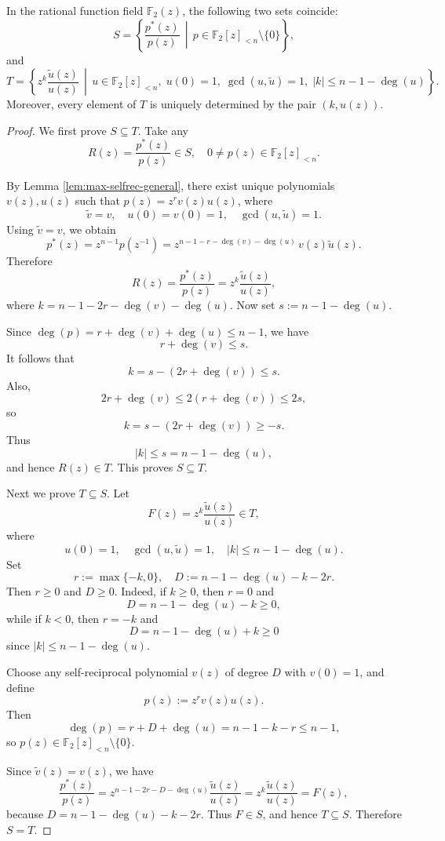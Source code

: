 \documentclass[hidelinks,onefignum,onetabnum]{siamart251216}
\theoremstyle{definition}
\theoremstyle{remark}
\begin{document}
\begin{proposition}\label{lem:S=T}
	In the rational function field $\mathbb F_2(z)$, the following two sets coincide:
	\[
	S=
	\left\{
	\frac{p^*(z)}{p(z)}
	\,\middle|\,
	p\in \mathbb F_2[z]_{<n}\setminus\{0\}
	\right\},
	\]
	and
	\[
	T=
	\left\{
	z^k\frac{\widetilde{u}(z)}{u(z)}
	\,\middle|\,
	u\in \mathbb F_2[z]_{<n},\;
	u(0)=1,\;
	\gcd(u,\widetilde{u})=1,\;
	|k|\le n-1-\deg(u)
	\right\}.
	\]
	Moreover, every element of $T$ is uniquely determined by the pair $(k,u(z))$.
\end{proposition}

\begin{proof}
	We first prove $S\subseteq T$. Take any
	\[
	R(z)=\frac{p^*(z)}{p(z)}\in S,
	\quad
	0\neq p(z)\in \mathbb F_2[z]_{<n}.
	\]
	
	By Lemma \ref{lem:max-selfrec-general}, there exist unique polynomials $v(z),u(z)$ such that $p(z)=z^r v(z)u(z)$, where
	\[
	\widetilde{v}=v,
	\quad
	u(0)=v(0)=1,
	\quad
	\gcd(u,\widetilde{u})=1.
	\]
	Using $\widetilde{v}=v$, we obtain
	\[
	p^*(z)
	=
	z^{n-1}p(z^{-1})
	=
	z^{n-1-r-\deg(v)-\deg(u)}\,v(z)\widetilde{u}(z).
	\]
	Therefore
	\[
	R(z)=\frac{p^*(z)}{p(z)}
	=
	z^k\frac{\widetilde{u}(z)}{u(z)},
	\]
	where $k=n-1-2r-\deg(v)-\deg(u)$. Now set $s:=n-1-\deg(u)$.
	
	
	Since $\deg(p)=r+\deg(v)+\deg(u)\le n-1$, we have
	\[
	r+\deg(v)\le s.
	\]
	It follows that
	\[
	k=s-(2r+\deg(v))\le s.
	\]
	Also,
	\[
	2r+\deg(v)\le 2(r+\deg(v))\le 2s,
	\]
	so
	\[
	k=s-(2r+\deg(v))\ge -s.
	\]
	Thus
	\[
	|k|\le s=n-1-\deg(u),
	\]
	and hence $R(z)\in T$. This proves $S\subseteq T$.
	
	
	\medskip
	
	Next we prove $T\subseteq S$. Let
	\[
	F(z)=z^k\frac{\widetilde{u}(z)}{u(z)}\in T,
	\]
	where
	\[
	u(0)=1,\quad \gcd(u,\widetilde{u})=1,\quad |k|\le n-1-\deg(u).
	\]
	Set
	\[
	r:=\max\{-k,0\},\quad D:=n-1-\deg(u)-k-2r.
	\]
	Then $r\ge 0$ and $D\ge 0$. Indeed, if $k\ge 0$, then $r=0$ and
	\[
	D=n-1-\deg(u)-k\ge 0,
	\]
	while if $k<0$, then $r=-k$ and
	\[
	D=n-1-\deg(u)+k\ge 0
	\]
	since $|k|\le n-1-\deg(u)$.
	
	Choose any self-reciprocal polynomial $v(z)$ of degree $D$ with $v(0)=1$, and define
	\[
	p(z):=z^r v(z)u(z).
	\]
	Then
	\[
	\deg(p)=r+D+\deg(u)=n-1-k-r\le n-1,
	\]
	so $p(z)\in \mathbb F_2[z]_{<n}\setminus\{0\}$.
	
	Since $\widetilde{v}(z)=v(z)$, we have
	\[
	\frac{p^*(z)}{p(z)}
	=
	z^{n-1-2r-D-\deg(u)}\frac{\widetilde{u}(z)}{u(z)}
	=
	z^k\frac{\widetilde{u}(z)}{u(z)}
	=
	F(z),
	\]
	because $D=n-1-\deg(u)-k-2r$. Thus $F\in S$, and hence $T\subseteq S$. Therefore $S=T$.
	

\end{proof}
\end{document}
